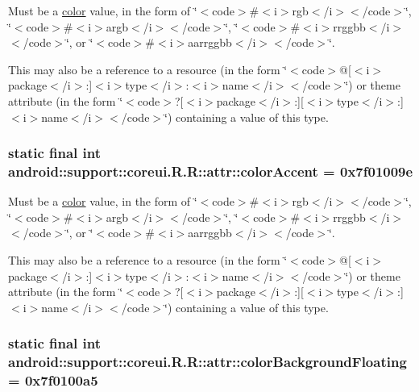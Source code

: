 Must be a \hyperlink{classandroid_1_1support_1_1coreui_1_1_r_1_1color}{color} value, in the form of \char`\"{}$<$code$>$\#$<$i$>$rgb$<$/i$>$$<$/code$>$\char`\"{}, \char`\"{}$<$code$>$\#$<$i$>$argb$<$/i$>$$<$/code$>$\char`\"{}, \char`\"{}$<$code$>$\#$<$i$>$rrggbb$<$/i$>$$<$/code$>$\char`\"{}, or \char`\"{}$<$code$>$\#$<$i$>$aarrggbb$<$/i$>$$<$/code$>$\char`\"{}. 

This may also be a reference to a resource (in the form \char`\"{}$<$code$>$@\mbox{[}$<$i$>$package$<$/i$>$:\mbox{]}$<$i$>$type$<$/i$>$:$<$i$>$name$<$/i$>$$<$/code$>$\char`\"{}) or theme attribute (in the form \char`\"{}$<$code$>$?\mbox{[}$<$i$>$package$<$/i$>$:\mbox{]}\mbox{[}$<$i$>$type$<$/i$>$:\mbox{]}$<$i$>$name$<$/i$>$$<$/code$>$\char`\"{}) containing a value of this type. \hypertarget{classandroid_1_1support_1_1coreui_1_1_r_1_1attr_8a3ad1f9d6c0149c33d66a5f847dd6f3}{
\subsubsection[{colorAccent}]{\setlength{\rightskip}{0pt plus 5cm}static final int android::support::coreui.R.R::attr::colorAccent = 0x7f01009e}}
\label{classandroid_1_1support_1_1coreui_1_1_r_1_1attr_8a3ad1f9d6c0149c33d66a5f847dd6f3}


Must be a \hyperlink{classandroid_1_1support_1_1coreui_1_1_r_1_1color}{color} value, in the form of \char`\"{}$<$code$>$\#$<$i$>$rgb$<$/i$>$$<$/code$>$\char`\"{}, \char`\"{}$<$code$>$\#$<$i$>$argb$<$/i$>$$<$/code$>$\char`\"{}, \char`\"{}$<$code$>$\#$<$i$>$rrggbb$<$/i$>$$<$/code$>$\char`\"{}, or \char`\"{}$<$code$>$\#$<$i$>$aarrggbb$<$/i$>$$<$/code$>$\char`\"{}. 

This may also be a reference to a resource (in the form \char`\"{}$<$code$>$@\mbox{[}$<$i$>$package$<$/i$>$:\mbox{]}$<$i$>$type$<$/i$>$:$<$i$>$name$<$/i$>$$<$/code$>$\char`\"{}) or theme attribute (in the form \char`\"{}$<$code$>$?\mbox{[}$<$i$>$package$<$/i$>$:\mbox{]}\mbox{[}$<$i$>$type$<$/i$>$:\mbox{]}$<$i$>$name$<$/i$>$$<$/code$>$\char`\"{}) containing a value of this type. \hypertarget{classandroid_1_1support_1_1coreui_1_1_r_1_1attr_472fed418ddf72223a5a8e402e1dd1c0}{
\subsubsection[{colorBackgroundFloating}]{\setlength{\rightskip}{0pt plus 5cm}static final int android::support::coreui.R.R::attr::colorBackgroundFloating = 0x7f0100a5}}
\label{classandroid_1_1support_1_1coreui_1_1_r_1_1attr_472fed418ddf72223a5a8e402e1dd1c0}


